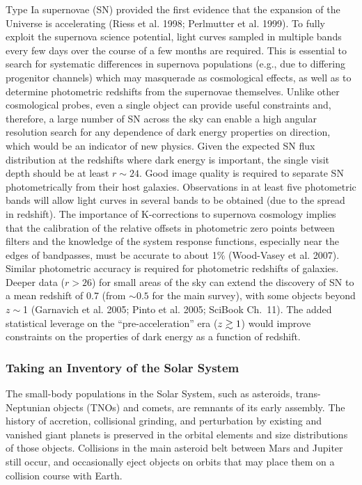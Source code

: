 \documentclass{emulateapj}
\begin{document}
Type Ia supernovae (SN) provided the first evidence that the expansion of the
Universe is accelerating (Riess et al. 1998; Perlmutter et al. 1999). To fully 
exploit the supernova science potential, light curves sampled in multiple
bands every few days over the course of a few months are required. This is
essential to search for systematic differences in supernova populations 
(e.g., due to differing progenitor channels) which 
may masquerade as cosmological effects, as well as to determine photometric 
redshifts from the supernovae themselves. Unlike other cosmological probes,
even a single object can provide useful constraints and, therefore, a large 
number of SN across the sky can enable a high angular resolution search for 
any dependence of dark energy properties on direction, which 
would be an indicator of new physics. Given the expected SN flux distribution
at the redshifts where dark energy is important, the 
single visit depth should be at least $r\sim24$. Good image quality is
required to separate SN photometrically from 
their host galaxies. Observations in at least five photometric bands will allow
light curves in several bands to be obtained (due to the spread in
redshift). The importance of K-corrections to supernova cosmology implies that the
calibration of the relative offsets in photometric zero points between filters and
the knowledge of the system response functions, especially near the edges of
bandpasses, must be accurate to about 1\% (Wood-Vasey et al. 2007). Similar
photometric accuracy is required for photometric redshifts of galaxies. Deeper data 
($r>26$) for small areas of the sky can extend the discovery of SN to a mean 
redshift of 0.7 (from $\sim0.5$ for the main survey), with some objects beyond $z\sim$1
(Garnavich et al. 2005; Pinto et al. 2005; SciBook Ch.~11). The added statistical leverage 
on the ``pre-acceleration'' era ($z\gtrsim1$) would improve constraints on the properties of 
dark energy as a function of redshift.


\subsubsection{Taking an Inventory of the Solar System}

The small-body populations in the Solar System, such as asteroids, 
trans-Neptunian objects (TNOs) and comets, are remnants of its early 
assembly. The history of accretion, collisional grinding, and perturbation 
by existing and vanished giant planets is preserved in the orbital elements 
and size distributions of those objects. Collisions in the main asteroid 
belt between Mars and Jupiter still occur, and occasionally eject objects
on orbits that may place them on a collision course with Earth. 
\end{document}

